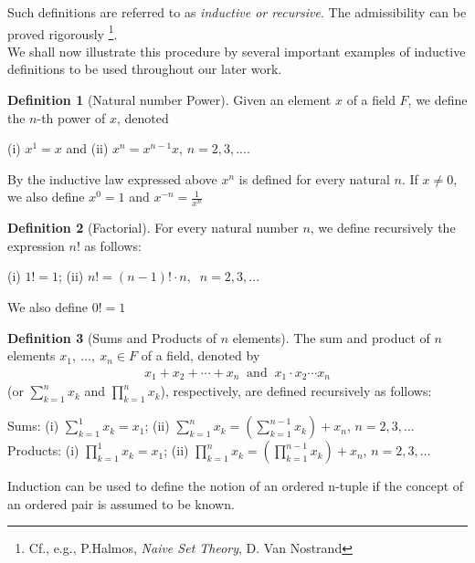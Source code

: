 \documentclass[12pt]{book}
\theoremstyle{definition}
\newtheorem{definition}{Definition}[section]
\begin{document}
Such definitions are referred to as \textit{inductive or recursive}. The admissibility can be proved rigorously \footnote{ Cf., e.g., P.Halmos, \textit{Naive Set Theory}, D. Van Nostrand }.\\
\indent We shall now illustrate this procedure by several important examples of inductive definitions to be used throughout our later work.
\begin{definition}[Natural number Power]
	Given an element $x$ of a field $F$, we define the $n$-th power of $x$, denoted 
\begin{center}
	(i) $x^1 =x$ and (ii) $x^n = x^{n-1}x$, $n =2,3, ...$.  
\end{center}
By the inductive law expressed above $x^n$ is defined for every natural $n$. If $x \neq 0$, we also define $x^0=1$ and $x^{-n} =\frac{1}{x^n}$
\end{definition}
\begin{definition}[Factorial]
	For every natural number $n$, we define recursively the expression $n!$ as follows:
\begin{center}
	(i) $1! =1$; (ii) $n! = (n-1)! \cdot n, \;\; n=2,3,... $
\end{center}
We also define $0!=1$ 
\end{definition}
\begin{definition}[Sums and Products of $n$ elements]
	The sum and product of $n$ elements $x_1,\ \ldots,\ x_n \in F$ of a field, denoted by
	\begin{align*}
		x_1+ x_2+ \cdots + x_n\;\; \text{and}\;\; x_1\cdot x_2 \cdots x_n 
	\end{align*}
(or $\sum_{k=1}^{n} x_k$ and $\prod_{k=1}^nx_k$), respectively, are defined recursively as follows:
\begin{center}
	Sums: \;\; (i) $\sum_{k=1}^1 x_k = x_1$;\;\; (ii) $\sum_{k=1}^n x_k = \left(\sum_{k=1}^{n-1} x_k\right) +x_n$, \;\; $n=2,3,\ldots$\\
	Products: \;\; (i) $\prod_{k=1}^1 x_k = x_1$;\;\; (ii) $\prod_{k=1}^n x_k = \left(\prod_{k=1}^{n-1} x_k\right) +x_n$, \;\; $n=2,3,\ldots$   
\end{center}
\end{definition}
 Induction can be used to define the notion of an ordered n-tuple if the concept of an ordered pair is assumed to be known. 
 
\end{document}
